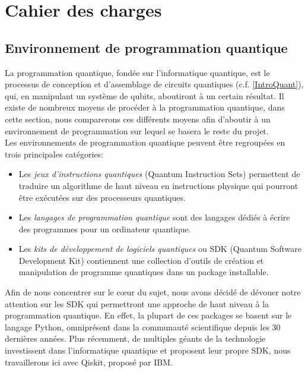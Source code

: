 \section{Cahier des charges}

\subsection{Environnement de programmation quantique}
\label{MedProg}
La programmation quantique, fondée sur l'informatique quantique, est le processus de conception et d’assemblage de circuits quantiques (c.f. \ref{IntroQuant}), qui, en manipulant un système de qubits, aboutiront à un certain résultat. Il existe de nombreux moyens de procéder à la programmation quantique, dans cette section, nous comparerons ces différents moyens afin d’aboutir à un environnement de programmation sur lequel se basera le reste du projet.
\\
Les environnements de programmation quantique peuvent être regroupées en trois principales catégories:

\begin{itemize}
\item Les \textit{jeux d'instructions quantiques} (Quantum Instruction Sets) permettent de traduire un algorithme de haut niveau en instructions physique qui pourront être exécutées sur des processeurs quantiques.
\item Les \textit{langages de programmation quantique} sont des langages dédiés à écrire des programmes pour un ordinateur quantique.
\item Les\textit{ kits de développement de logiciels quantiques} ou SDK (Quantum Software Development Kit) contiennent une collection d’outils de création et manipulation de programme quantiques dans un package installable.
\end{itemize}

\noindent Afin de nous concentrer sur le cœur du sujet, nous avons décidé de dévouer notre attention sur les SDK qui permettront une approche de haut niveau à la programmation quantique. En effet, la plupart de ces packages se basent sur le langage Python, omniprésent dans la communauté scientifique depuis les 30 dernières années. Plus récemment, de multiples géants de la technologie investissent dans l’informatique quantique et proposent leur propre SDK, nous travaillerons ici avec Qiskit, proposé par IBM. 
\\


